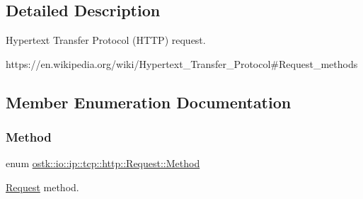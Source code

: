 \subsection{Detailed Description}
Hypertext Transfer Protocol (H\+T\+TP) request. 

https\+://en.wikipedia.\+org/wiki/\+Hypertext\+\_\+\+Transfer\+\_\+\+Protocol\#\+Request\+\_\+methods 

\subsection{Member Enumeration Documentation}
\mbox{\label{classostk_1_1io_1_1ip_1_1tcp_1_1http_1_1_request_a07a40d81f4a6fb8443c80afc11571dd3}} 
\subsubsection{\texorpdfstring{Method}{Method}}
{\footnotesize\ttfamily enum \hyperlink{classostk_1_1io_1_1ip_1_1tcp_1_1http_1_1_request_a07a40d81f4a6fb8443c80afc11571dd3}{ostk\+::io\+::ip\+::tcp\+::http\+::\+Request\+::\+Method}\hspace{0.3cm}{\ttfamily [strong]}}



\hyperlink{classostk_1_1io_1_1ip_1_1tcp_1_1http_1_1_request}{Request} method. 

